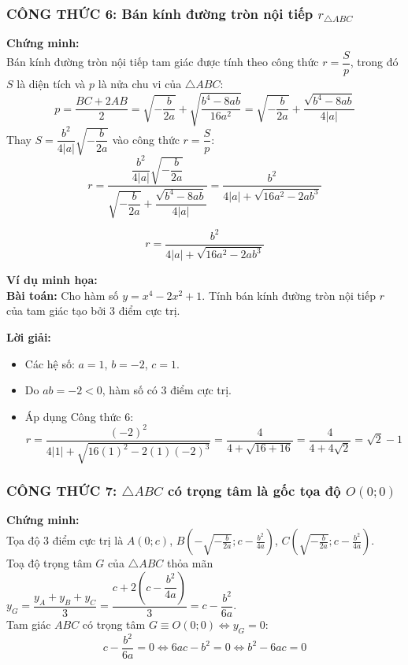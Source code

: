 \begin{itemize}
\subsubsection{CÔNG THỨC 6: Bán kính đường tròn nội tiếp $r_{\triangle ABC}$}

\noindent \textbf{Chứng minh:} \\
Bán kính đường tròn nội tiếp tam giác được tính theo công thức $r = \dfrac{S}{p}$, trong đó $S$ là diện tích và $p$ là nửa chu vi của $\triangle ABC$:
\[
p = \frac{BC + 2AB}{2} = \sqrt{-\frac{b}{2a}} + \sqrt{\frac{b^4 - 8ab}{16a^2}} = \sqrt{-\frac{b}{2a}} + \frac{\sqrt{b^4 - 8ab}}{4|a|}
\]
Thay $S = \dfrac{b^2}{4|a|}\sqrt{-\dfrac{b}{2a}}$ vào công thức $r = \dfrac{S}{p}$:
\[
r = \frac{\dfrac{b^2}{4|a|}\sqrt{-\dfrac{b}{2a}}}{\sqrt{-\dfrac{b}{2a}} + \dfrac{\sqrt{b^4 - 8ab}}{4|a|}} = \frac{b^2}{4|a| + \sqrt{16a^2 - 2ab^3}}
\]

\begin{tcolorbox}[title=CÔNG THỨC GIẢI NHANH 6]
\[
r = \frac{b^2}{4|a| + \sqrt{16a^2 - 2ab^3}}
\]
\end{tcolorbox}

\noindent \textbf{Ví dụ minh họa:} \\
\textbf{Bài toán:} Cho hàm số $y = x^4 - 2x^2 + 1$. Tính bán kính đường tròn nội tiếp $r$ của tam giác tạo bởi 3 điểm cực trị.

\noindent \textbf{Lời giải:}
\begin{itemize}
    \item Các hệ số: $a = 1$, $b = -2$, $c = 1$.
    \item Do $ab = -2 < 0$, hàm số có 3 điểm cực trị.
    \item Áp dụng Công thức 6:
    \[
    r = \frac{(-2)^2}{4|1| + \sqrt{16(1)^2 - 2(1)(-2)^3}} = \frac{4}{4 + \sqrt{16 + 16}} = \frac{4}{4 + 4\sqrt{2}} = \sqrt{2} - 1
    \]
\end{itemize}
\vspace{0.5cm}

\subsubsection{CÔNG THỨC 7: $\triangle ABC$ có trọng tâm là gốc tọa độ $O(0;0)$}

\noindent \textbf{Chứng minh:} \\
Tọa độ 3 điểm cực trị là $A(0; c)$, $B\left(-\sqrt{-\frac{b}{2a}}; c - \frac{b^2}{4a}\right)$, $C\left(\sqrt{-\frac{b}{2a}}; c - \frac{b^2}{4a}\right)$. \\
Toạ độ trọng tâm $G$ của $\triangle ABC$ thỏa mãn $y_G = \dfrac{y_A + y_B + y_C}{3} = \dfrac{c + 2\left(c - \dfrac{b^2}{4a}\right)}{3} = c - \dfrac{b^2}{6a}$. \\
Tam giác $ABC$ có trọng tâm $G \equiv O(0;0) \iff y_G = 0$:
\[
c - \frac{b^2}{6a} = 0 \iff 6ac - b^2 = 0 \iff b^2 - 6ac = 0
\]


\end{itemize}
